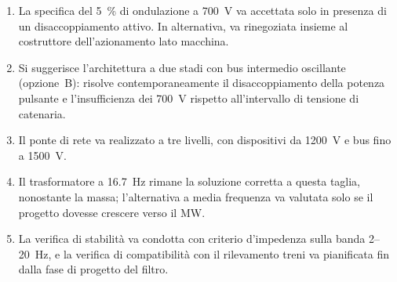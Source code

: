 \documentclass[11pt,a4paper]{article}
\begin{document}
\begin{enumerate}
\item La specifica del \SI{5}{\percent} di ondulazione a \SI{700}{\volt} va accettata solo
in presenza di un disaccoppiamento attivo. In alternativa, va rinegoziata insieme al
costruttore dell'azionamento lato macchina.
\item Si suggerisce l'architettura a due stadi con bus intermedio oscillante
(opzione~B): risolve contemporaneamente il disaccoppiamento della potenza pulsante e
l'insufficienza dei \SI{700}{\volt} rispetto all'intervallo di tensione di catenaria.
\item Il ponte di rete va realizzato a tre livelli, con dispositivi da
\SI{1200}{\volt} e bus fino a \SI{1500}{\volt}.
\item Il trasformatore a \SI{16.7}{\hertz} rimane la soluzione corretta a questa
taglia, nonostante la massa; l'alternativa a media frequenza va valutata solo se il
progetto dovesse crescere verso il \si{\mega\watt}.
\item La verifica di stabilità va condotta con criterio d'impedenza sulla banda
\SI{2}{}--\SI{20}{\hertz}, e la verifica di compatibilità con il rilevamento treni va
pianificata fin dalla fase di progetto del filtro.
\end{enumerate}
\end{document}
